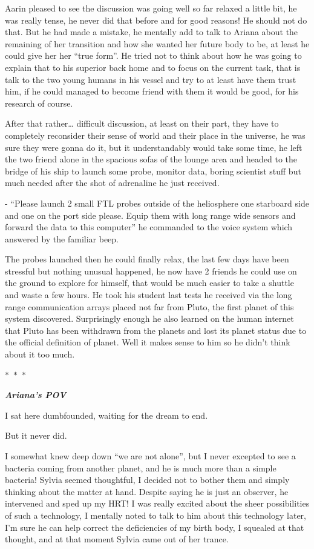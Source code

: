 \documentclass[hidelinks,12pt,a4paper]{book}
\newcommand\sep{\begin{center}
  $\ast$~$\ast$~$\ast$
\end{center}}
\begin{document}
Aarin pleased to see the discussion was going well so far relaxed a little bit, he was really tense, 
he never did that before and for good reasons! He should not do that. But he had made a mistake, 
he mentally add to talk to Ariana about the remaining of her transition and how she wanted her future body to be, 
at least he could give her her “true form”. He tried not to think about how he was going to explain that to his superior 
back home and to focus on the current task, that is talk to the two young humans in his vessel and try to at least have 
them trust him, if he could managed to become friend with them it would be good, for his research of course.\par
\bigskip
After that rather… difficult discussion, at least on their part, they have to completely reconsider their 
sense of world and their place in the universe, he was sure they were gonna do it, but it understandably would
 take some time, he left the two friend alone in the spacious sofas of the lounge area and headed to the bridge of 
 his ship to launch some probe, monitor data, boring scientist stuff but much needed after the shot of adrenaline he 
 just received.\par
 \bigskip

- “Please launch 2 small FTL probes outside of the heliosphere one starboard side and one on the port side please. 
Equip them with long range wide sensors and forward the data to this computer” he commanded to the voice system 
which answered by the familiar beep.\par
\bigskip

The probes launched then he could finally relax, the last few days have been stressful but nothing unusual happened,
 he now have 2 friends he could use on the ground to explore for himself, that would be much easier to take a 
 shuttle and waste a few hours. He took his student last tests he received via the long range communication arrays
  placed not far from Pluto, the first planet of this system discovered. Surprisingly enough he also learned on 
  the human internet that Pluto has been withdrawn from the planets and lost its planet status due to
   the official definition of planet. Well it makes sense to him so he didn't think about it too much.

\sep 

\textit{\textbf{Ariana's POV}}\par
\bigskip
I sat here dumbfounded, waiting for the dream to end.\par
\bigskip
But it never did.\par
\bigskip
I somewhat knew deep down “we are not alone”, but I never excepted to see a bacteria coming from another planet, and he is much more than a simple bacteria!
Sylvia seemed thoughtful, I decided not to bother them and simply thinking about the matter at hand. 
Despite saying he is just an observer, he intervened and sped up my HRT! I was really excited about the sheer possibilities 
of such a technology, I mentally noted to talk to him about this technology later, I'm sure he can help correct 
the deficiencies of my birth body, I squealed at that thought, and at that moment Sylvia came out of her trance.\par
\bigskip
\end{document}
